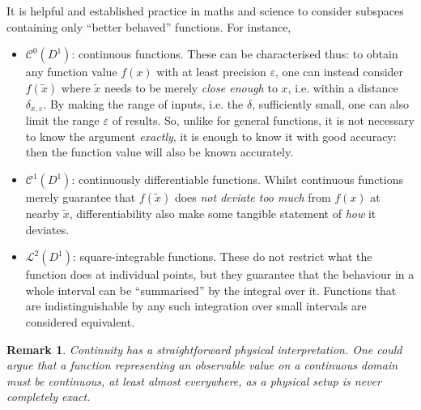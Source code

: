 \documentclass[sigplan,screen]{acmart}
\theoremstyle{acmplain}
\theoremstyle{acmdefinition}
\newtheorem{remark}[theorem]{Remark}
\begin{document}
It is helpful and established practice in maths and science to consider subspaces containing only “better behaved” functions.
For instance,
\begin{itemize}
\item $\mathcal{C}^0(D^1)$: continuous functions.
  These can be characterised thus: to obtain any function value $f(x)$ with at least precision $\varepsilon$, one can instead consider $f(\tilde{x})$ where $\tilde{x}$ needs to be merely \emph{close enough} to $x$, i.e. within a distance $\delta_{x,\varepsilon}$. By making the range of inputs, i.e. the $\delta$, sufficiently small, one can also limit the range $\varepsilon$ of results. So, unlike for general functions, it is not necessary to know the argument \emph{exactly}, it is enough to know it with good accuracy: then the function value will also be known accurately.
 \item $\mathcal{C}^1(D^1)$: continuously differentiable functions. Whilst continuous functions merely guarantee that $f(\tilde{x})$ does \emph{not deviate too much} from $f(x)$ at nearby $\tilde{x}$, differentiability also make some tangible statement of \emph{how} it deviates.
 \item $\mathcal{L}^2(D^1)$: square-integrable functions. These do not restrict what the function does at individual points, but they guarantee that the behaviour in a whole interval can be “summarised” by the integral over it. Functions that are indistinguishable by any such integration over small intervals are considered equivalent.
\end{itemize}
\begin{remark}
  Continuity has a straightforward physical interpretation.
  One could argue that a function representing an observable value on a continuous domain \emph{must} be continuous, at least almost everywhere,
  as a physical setup is never completely exact.
\end{remark}
\end{document}
